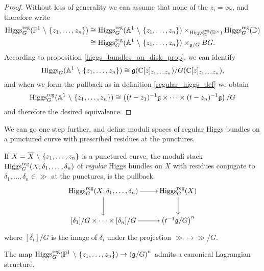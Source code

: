 \documentclass[10pt, oneside, a4paper]{article}
\begin{document}
\begin{proof}
Without loss of generality we can assume that none of the $z_i = \infty$, and therefore write
\begin{align*}
\operatorname{Higgs}_G^{\mathrm{reg}}(\mathbb{P}^1 \ \backslash \  \{z_1, \ldots, z_n\}) &\cong \operatorname{Higgs}_G^{\mathrm{reg}}(\mathbb{A}^1 \ \backslash \  \{z_1, \ldots, z_n\}) \times_{\operatorname{Higgs}_G^{\mathrm{reg}}(\mathbb{D}^\times)} \operatorname{Higgs}_G^{\mathrm{reg}}(\mathbb{D}) \\
&\cong \operatorname{Higgs}_G^{\mathrm{reg}}(\mathbb{A}^1 \ \backslash \  \{z_1, \ldots, z_n\}) \times_{\mathfrak{g}/G} BG. 
\end{align*}
According to proposition \ref{higgs_bundles_on_disk_prop}, we can identify 
\[\operatorname{Higgs}_G(\mathbb{A}^1 \ \backslash \  \{z_1, \ldots, z_n\}) \cong \mathfrak{g}(\mathbb{C}[z]_{z_1, \ldots, z_n})/G(\mathbb{C}[z]_{z_1, \ldots, z_n}),\]
and when we form the pullback as in definition \ref{regular_higgs_def} we obtain 
\[\operatorname{Higgs}_G^{\mathrm{reg}}(\mathbb{A}^1 \ \backslash \  \{z_1, \ldots, z_n\}) \cong \left((t-z_1)^{-1}\mathfrak{g} \times \cdots \times (t-z_n)^{-1}\mathfrak{g}\right)/G\]
and therefore the desired equivalence.
\end{proof}

We can go one step further, and define moduli spaces of regular Higgs bundles on a punctured curve with prescribed residues at the punctures.
\begin{definition}
If $X = \overline{X} \ \backslash \  \{z_1, \ldots, z_n\}$ is a punctured curve, the moduli stack $\operatorname{Higgs}_G^{\mathrm{reg}}(X; \delta_1, \ldots, \delta_n)$ of \emph{regular} Higgs bundles on $X$ with residues conjugate to $\delta_1, \ldots, \delta_n \in \gg$ at the punctures, is the pullback
\[\xymatrix{
\higgs_G^{\mr{reg}}(X; \delta_1, \ldots, \delta_n) \ar[r] \ar[d] &\higgs_G^{\mr{reg}}(X) \ar[d] \\
[\delta_1]/G \times \cdots \times [\delta_n]/G \ar[r] &\left(t^{-1}\gg/G\right)^n
}\]
where $[\delta_i]/G$ is the image of $\delta_i$ under the projection $\gg \to \gg/G$.
\end{definition}

\begin{lemma} \label{higgs_lagrangian_structure_lemma}
The map $\operatorname{Higgs}_G^{\mathrm{reg}}(\mathbb{P}^1 \ \backslash \  \{z_1, \ldots, z_n\}) \to \left(\mathfrak{g}/G\right)^n$ admits a canonical Lagrangian structure.
\end{lemma}
\end{document}
